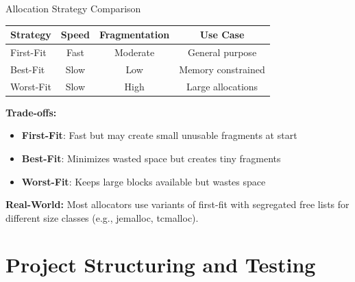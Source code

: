 \documentclass[aspectratio=169,xcolor=dvipsnames]{beamer}
\begin{document}
\begin{frame}{Allocation Strategy Comparison}
  \begin{table}
    \centering
    \small
    \begin{tabular}{lccc}
      \hline
      \textbf{Strategy} & \textbf{Speed} & \textbf{Fragmentation} & \textbf{Use Case} \\
      \hline
      First-Fit & Fast & Moderate & General purpose \\
      Best-Fit & Slow & Low & Memory constrained \\
      Worst-Fit & Slow & High & Large allocations \\
      \hline
    \end{tabular}
  \end{table}

  \vspace{0.3cm}
  \textbf{Trade-offs:}
  \begin{itemize}
    \item \textbf{First-Fit}: Fast but may create small unusable fragments at start
    \item \textbf{Best-Fit}: Minimizes wasted space but creates tiny fragments
    \item \textbf{Worst-Fit}: Keeps large blocks available but wastes space
  \end{itemize}

  \vspace{0.3cm}
  \textbf{Real-World:} Most allocators use variants of first-fit with segregated free lists for different size classes (e.g., jemalloc, tcmalloc).
\end{frame}

\section{Project Structuring and Testing}
\end{document}

